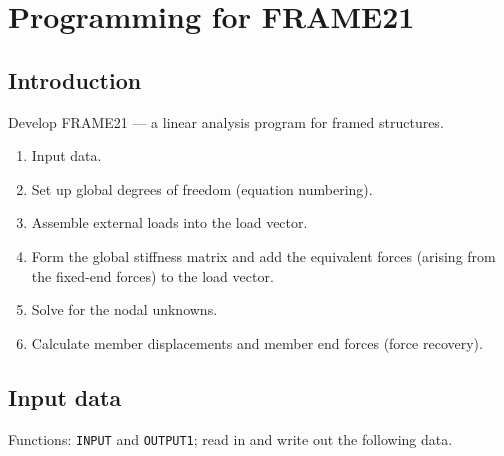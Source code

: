 \chapter{Programming for FRAME21}
\label{ch:frame21}

\section{Introduction}
Develop \textsc{FRAME21} --- a linear analysis program for framed structures.

\begin{enumerate}
  \item Input data.
  \item Set up global degrees of freedom (equation numbering).
  \item Assemble external loads into the load vector.
  \item Form the global stiffness matrix and add the equivalent forces (arising from the fixed-end forces) to the load vector.
  \item Solve for the nodal unknowns.
  \item Calculate member displacements and member end forces (force recovery).
\end{enumerate}

\section{Input data}
Functions: \texttt{INPUT} and \texttt{OUTPUT1}; read in and write out the following data.

